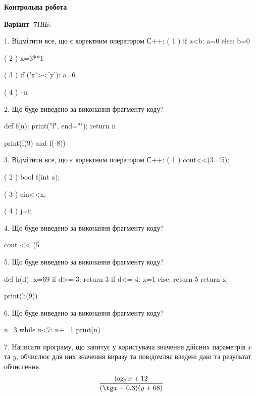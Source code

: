 \documentclass[11pt]{article}
\begin{document}
{\large\textbf{Контрольна робота}}

\textbf{Варіант \No\,7}\hfill \textit{ПІБ:}\,\underline{\hspace{60mm}}
\vspace{4mm}

1. %
Відмітити все, що є коректним оператором С++:
( 1 ) if a<b: a=0 else: b=0

( 2 ) x=3**1

( 3 ) if ('x'><'y'): a=6

( 4 ) --n
\vspace{5mm}

2. Що буде виведено за виконання фрагменту коду?

def f(n):
    print("f", end="");
    return n

print(f(9) and f(-8))
\vspace{5mm}

3. %
Відмітити все, що є коректним оператором С++:
( 1 ) cout<<(3=!5);

( 2 ) bool f(int a);

( 3 ) cin<<x;

( 4 ) j=i;
\vspace{5mm}

4. Що буде виведено за виконання фрагменту коду?

cout << (5 %
\vspace{5mm}

5. Що буде виведено за виконання фрагменту коду?

def h(d):
    x=69
    if d>=-3: 
        return 3
    if d<=-4:
         x=1
    else:
         return 5
    return x

print(h(9))
\vspace{5mm}

6. Що буде виведено за виконання фрагменту коду?

n=3
while n<7:
    n+=1
print(n)

\vspace{5mm}

7. 
Написати програму, що запитує у користувача значення дійсних параметрів $x$ та $y$, обчислює для них значення виразу та повiдомляє введенi данi та результат обчислення.
$$\frac{\log_{2} x + 12}{(\tg x + 0.3) (y + 68)}$$ 

\vspace{5mm}
\end{document}
